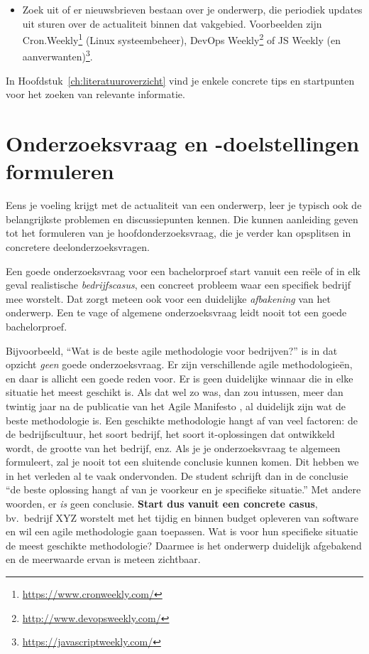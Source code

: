 \begin{itemize}
  \item Zoek uit of er nieuwsbrieven bestaan over je onderwerp, die periodiek updates uit sturen over de actualiteit binnen dat vakgebied. Voorbeelden zijn Cron.Weekly\footnote{\url{https://www.cronweekly.com/}} (Linux systeembeheer), DevOps Weekly\footnote{\url{http://www.devopsweekly.com/}} of JS Weekly (en aanverwanten)\footnote{\url{https://javascriptweekly.com/}}.
\end{itemize}

In Hoofdstuk~\ref{ch:literatuuroverzicht} vind je enkele concrete tips en startpunten voor het zoeken van relevante informatie.

\section{Onderzoeksvraag en -doelstellingen formuleren}%
\label{sec:onderzoeksvraag_formuleren}

Eens je voeling krijgt met de actualiteit van een onderwerp, leer je typisch ook de belangrijkste problemen en discussiepunten kennen. Die kunnen aanleiding geven tot het formuleren van je hoofdonderzoeksvraag, die je verder kan opsplitsen in concretere deelonderzoeksvragen.

Een goede onderzoeksvraag voor een bachelorproef start vanuit een reële of in elk geval realistische \textit{bedrijfscasus}, een concreet probleem waar een specifiek bedrijf mee worstelt. Dat zorgt meteen ook voor een duidelijke \textit{afbakening} van het onderwerp. Een te vage of algemene onderzoeksvraag leidt nooit tot een goede bachelorproef.

Bijvoorbeeld, ``Wat is de beste agile methodologie voor bedrijven?'' is in dat opzicht \textit{geen} goede onderzoeksvraag. Er zijn verschillende agile methodologieën, en daar is allicht een goede reden voor. Er is geen duidelijke winnaar die in elke situatie het meest geschikt is. Als dat wel zo was, dan zou intussen, meer dan twintig jaar na de publicatie van het Agile Manifesto \autocite{Beck2001}, al duidelijk zijn wat de beste methodologie is. Een geschikte methodologie hangt af van veel factoren: de de bedrijfscultuur, het soort bedrijf, het soort it-oplossingen dat ontwikkeld wordt, de grootte van het bedrijf, enz. Als je je onderzoeksvraag te algemeen formuleert, zal je nooit tot een sluitende conclusie kunnen komen. Dit hebben we in het verleden al te vaak ondervonden. De student schrijft dan in de conclusie ``de beste oplossing hangt af van je voorkeur en je specifieke situatie.'' Met andere woorden, er \textit{is} geen conclusie. \textbf{Start dus vanuit een concrete casus}, bv.\ bedrijf XYZ worstelt met het tijdig en binnen budget opleveren van software en wil een agile methodologie gaan toepassen. Wat is voor hun specifieke situatie de meest geschikte methodologie? Daarmee is het onderwerp duidelijk afgebakend en de meerwaarde ervan is meteen zichtbaar.

